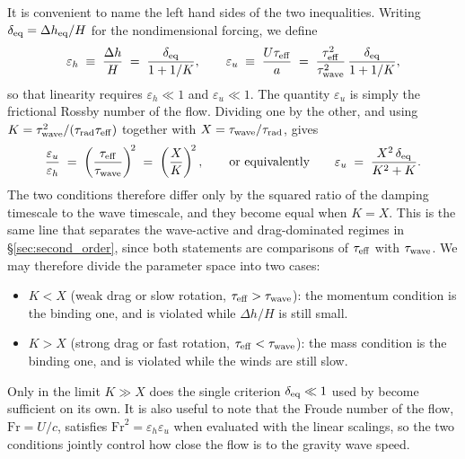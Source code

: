\documentclass[trackchanges,twocolumn]{aastex7}
\begin{document}
It is convenient to name the left hand sides of the two inequalities. Writing
$\delta_{\rm eq} = \Delta h_{\rm eq}/H$ for the nondimensional forcing, we define
\begin{equation}
    \varepsilon_h \;\equiv\; \frac{\Delta h}{H} \;=\; \frac{\delta_{\rm eq}}{1+1/K},
    \qquad
    \varepsilon_u \;\equiv\; \frac{U\tau_{\rm eff}}{a}
    \;=\; \frac{\tau_{\rm eff}^{2}}{\tau_{\rm wave}^{2}}\,\frac{\delta_{\rm eq}}{1+1/K},
    \label{eq:app_eps}
\end{equation}
so that linearity requires $\varepsilon_h \ll 1$ and $\varepsilon_u \ll 1$. The quantity
$\varepsilon_u$ is simply the frictional Rossby number of the flow. Dividing one by the other,
and using $K = \tau_{\rm wave}^2/(\tau_{\rm rad}\tau_{\rm eff})$ together with
$X = \tau_{\rm wave}/\tau_{\rm rad}$, gives
\begin{equation}
    \frac{\varepsilon_u}{\varepsilon_h}
    \;=\; \left(\frac{\tau_{\rm eff}}{\tau_{\rm wave}}\right)^{\!2}
    \;=\; \left(\frac{X}{K}\right)^{\!2},
    \qquad\text{or equivalently}\qquad
    \varepsilon_u \;=\; \frac{X^{2}\,\delta_{\rm eq}}{K^{2}+K}.
    \label{eq:app_ratio}
\end{equation}
The two conditions therefore differ only by the squared ratio of the damping timescale to the
wave timescale, and they become equal when $K = X$. This is the same line that separates the
wave-active and drag-dominated regimes in \S\ref{sec:second_order}, since both statements are
comparisons of $\tau_{\rm eff}$ with $\tau_{\rm wave}$. We may therefore divide the parameter
space into two cases:
\begin{itemize}
    \item $K < X$ (weak drag or slow rotation, $\tau_{\rm eff} > \tau_{\rm wave}$): the
    momentum condition is the binding one, and is violated while $\Delta h/H$ is still small.
    \item $K > X$ (strong drag or fast rotation, $\tau_{\rm eff} < \tau_{\rm wave}$): the mass
    condition is the binding one, and is violated while the winds are still slow.
\end{itemize}
Only in the limit $K \gg X$ does the single criterion $\delta_{\rm eq} \ll 1$ used by
\citet{perez2013atmospheric} become sufficient on its own. It is also useful to note that the
Froude number of the flow, $\mathrm{Fr} = U/c$, satisfies $\mathrm{Fr}^{2} =
\varepsilon_h\varepsilon_u$ when evaluated with the linear scalings, so the two conditions
jointly control how close the flow is to the gravity wave speed.
\end{document}
